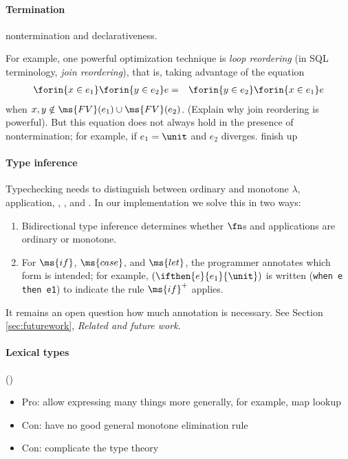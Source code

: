 \documentclass[preprint]{sigplanconf}
\begin{document}
\paragraph{Termination} \TODO nontermination and declarativeness.

For example, one powerful optimization technique is \emph{loop reordering} (in
SQL terminology, \emph{join reordering}), that is, taking advantage of the
equation
\begin{eqnarray*}
  \forin{x \in e_1} \forin{y \in e_2} e
  &=& \forin{y \in e_2} \forin{x \in e_1} e
\end{eqnarray*}
when $x,y \notin \ms{FV}(e_1) \cup \ms{FV}(e_2)$. (\TODO Explain why join
reordering is powerful). But this equation does not always hold in the presence
of nontermination; for example, if $e_1 = \unit$ and $e_2$ diverges. \TODO
finish up

\paragraph{Type inference} Typechecking needs to distinguish between ordinary
and monotone $\lambda$, application, , , and . In our
implementation we solve this in two ways:
\begin{enumerate}
\item Bidirectional type inference  determines whether $\fn$s and
  applications are ordinary or monotone.
\item For $\ms{if}$, $\ms{case}$, and $\ms{let}$, the programmer annotates which
  form is intended; for example, $(\ifthen{e}{e_1}{\unit})$ is written
  (\texttt{when e then e1}) to indicate the rule $\ms{if}^+$ applies.
\end{enumerate}

It remains an open question how much annotation is necessary. See
Section \ref{sec:futurework}, \emph{Related and future work}.

\paragraph{Lexical types} ()
\begin{itemize}
\item Pro: allow expressing many things more generally, for example, map lookup
\item Con: have no good general monotone elimination rule
\item Con: complicate the type theory
\end{itemize}
\end{document}
